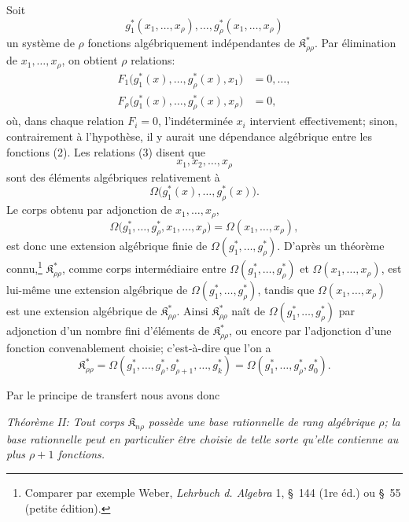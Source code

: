 \documentclass[11pt]{article}
\providecommand{\Kfield}{\mathfrak{K}}
\begin{document}
Soit
\begin{equation}
  g_1^*(x_1,\ldots,x_\rho),\ldots,
  g_\rho^*(x_1,\ldots,x_\rho)
\tag{2}
\end{equation}
un système de $\rho$ fonctions algébriquement indépendantes de $\Kfield^*_{\rho\rho}$. Par élimination de $x_1,\ldots,x_\rho$, on obtient $\rho$ relations:
\begin{equation}
\begin{aligned}
  F_1\bigl(g_1^*(x),\ldots,g_\rho^*(x),x_1\bigr)&=0,\ldots,\\
  F_\rho\bigl(g_1^*(x),\ldots,g_\rho^*(x),x_\rho\bigr)&=0,
\end{aligned}
\tag{3}
\end{equation}
où, dans chaque relation $F_i=0$, l'indéterminée $x_i$ intervient effectivement; sinon, contrairement à l'hypothèse, il y aurait une dépendance algébrique entre les fonctions (2). Les relations (3) disent que
\[
  x_1,x_2,\ldots,x_\rho
\]
sont des éléments algébriques relativement à
\[
  \Omega\bigl(g_1^*(x),\ldots,g_\rho^*(x)\bigr).
\]
Le corps obtenu par adjonction de $x_1,\ldots,x_\rho$,
\[
  \Omega\bigl(g_1^*,\ldots,g_\rho^*,x_1,
  \ldots,x_\rho\bigr)=\Omega(x_1,
  \ldots,x_\rho),
\]
est donc une extension algébrique finie de $\Omega(g_1^*,\ldots,g_\rho^*)$. D'après un théorème connu,\footnote{Comparer par exemple Weber, \emph{Lehrbuch d. Algebra} 1, \S\ 144 (1re éd.) ou \S\ 55 (petite édition).} $\Kfield^*_{\rho\rho}$, comme corps intermédiaire entre $\Omega(g_1^*,\ldots,g_\rho^*)$ et $\Omega(x_1,\ldots,x_\rho)$, est lui-même une extension algébrique de $\Omega(g_1^*,\ldots,g_\rho^*)$, tandis que $\Omega(x_1,\ldots,x_\rho)$ est une extension algébrique de $\Kfield^*_{\rho\rho}$. Ainsi $\Kfield^*_{\rho\rho}$ naît de $\Omega(g_1^*,\ldots,g_\rho^*)$ par adjonction d'un nombre fini d'éléments de $\Kfield^*_{\rho\rho}$, ou encore par l'adjonction d'une fonction convenablement choisie; c'est-à-dire que l'on a
\[
  \Kfield^*_{\rho\rho}
  =\Omega(g_1^*,\ldots,g_\rho^*,g_{\rho+1}^*,\ldots,g_k^*)
  =\Omega(g_1^*,\ldots,g_\rho^*,g_0^*).
\]

Par le principe de transfert nous avons donc

\emph{Théorème II: Tout corps $\Kfield_{n\rho}$ possède une base rationnelle de rang algébrique $\rho$; la base rationnelle peut en particulier être choisie de telle sorte qu'elle contienne au plus $\rho+1$ fonctions.}
\end{document}
